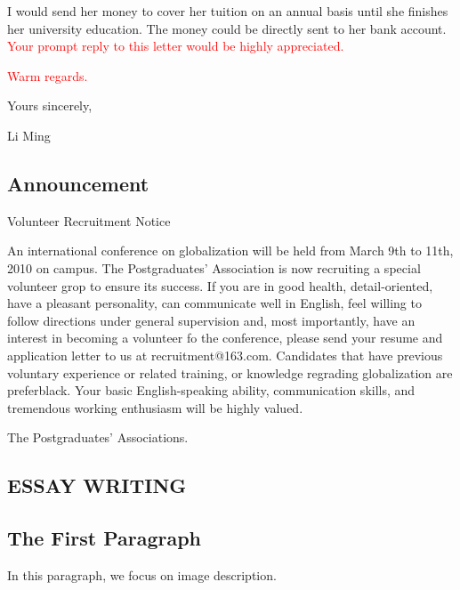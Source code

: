 \documentclass{article}
\makeatletter
\newcommand{\Rmnum}[1]{\expandafter\@slowromancap\romannumeral #1@}
\makeatother
\begin{document}
\par I would send her money to cover her tuition on an annual basis until she finishes her
university education. The money could be directly sent to her bank
account. \textcolor{red}{Your prompt reply to this letter would be highly appreciated.}

\par \textcolor{red}{Warm regards.}

\hfill Yours sincerely,

\hfill Li Ming

\subsection{Announcement}
\label{sec:letter}

\centerline{Volunteer Recruitment Notice}

\hspace{0.4cm} An international conference on globalization will be held from March 9th to 11th,
2010 on campus. The Postgraduates' Association is now recruiting a special volunteer grop
to ensure its success. If you are in good health, detail-oriented, have a pleasant
personality, can communicate well in English, feel willing to follow directions under
general supervision and, most importantly, have an interest in becoming a volunteer fo the
conference, please send your resume and application letter to us at
recruitment@163.com. Candidates that have previous voluntary experience or related
training, or knowledge regrading globalization are preferblack. Your basic English-speaking
ability, communication skills, and tremendous working enthusiasm will be highly valued.

\hfill The Postgraduates' Associations.

\begin{center}
  \section{ESSAY WRITING}
\end{center}

\label{sec:essay-writings}

\subsection{The First Paragraph}
\label{sec:first-paragraph}

In this paragraph, we focus on image description. 
\end{document}
